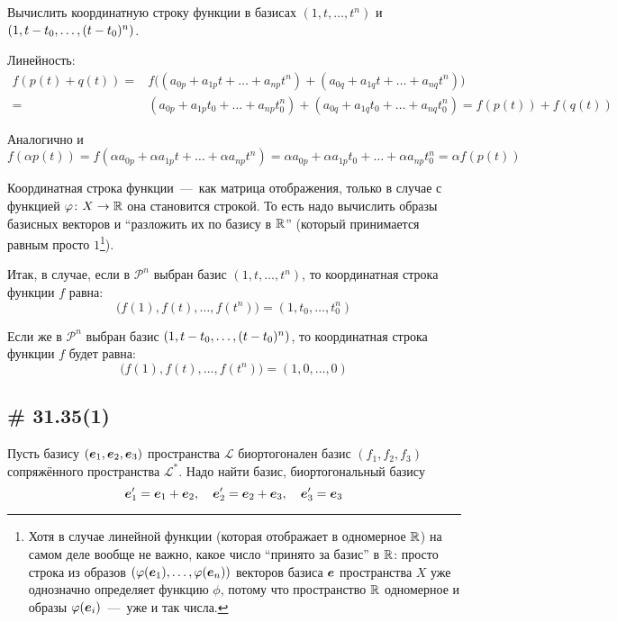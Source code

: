 \documentclass[a4paper,12pt]{article}
\begin{document}
  Вычислить координатную строку функции в базисах $(1, t, \ldots, t^n)$ и $(1, t \hm- t_0, \ldots, (t \hm- t_0)^n)$.
  
  \begin{solution}
    Линейность:
    \begin{equation*}
    \begin{split}
      f(p(t) + q(t)) = &f\bigl((a_{0p} + a_{1p} t + \ldots + a_{np} t^n) + (a_{0q} + a_{1q} t + \ldots + a_{nq} t^n)\bigr)\\
      = &(a_{0p} + a_{1p} t_0 + \ldots + a_{np} t_0^n) + (a_{0q} + a_{1q} t_0 + \ldots + a_{nq} t_0^n)
      = f(p(t)) + f(q(t))
    \end{split}
    \end{equation*}
    
    Аналогично и
    \[
      f(\alpha p(t)) = f(\alpha a_{0p} + \alpha a_{1p} t + \ldots + \alpha a_{np} t^n)
      = \alpha a_{0p} + \alpha a_{1p} t_0 + \ldots + \alpha a_{np} t_0^n
      = \alpha f(p(t))
    \]
    
    Координатная строка функции~---~как матрица отображения, только в случае с функцией $\phi\colon X \hm\to \RR$ она становится строкой.
    То есть надо вычислить образы базисных векторов и ``разложить их по базису в $\operatorname{\mathbb R}$'' (который принимается равным просто $1$\footnote{Хотя в случае линейной функции (которая отображает в одномерное $\operatorname{\mathbb R}$) на самом деле вообще не важно, какое число ``принято за базис'' в $\operatorname{\mathbb R}$: просто строка из образов $(\varphi(\boldsymbol e_1), \ldots, \varphi(\boldsymbol e_n))$ векторов базиса $\boldsymbol e$ пространства $X$ уже однозначно определяет функцию $\phi$, потому что пространство $\operatorname{\mathbb R}$ одномерное и образы $\varphi(\boldsymbol e_i)$~---~уже и так числа.}).
    
    Итак, в случае, если в $\mathcal P^{n}$ выбран базис $(1, t, \ldots, t^n)$, то координатная строка функции $f$ равна:
    \[
      \bigl(f(1), f(t), \ldots, f(t^n)\bigr) = (1, t_0, \ldots, t_0^n)
    \]
    
    Если же в $\mathcal P^{n}$ выбран базис $(1, t \hm- t_0, \ldots, (t \hm- t_0)^n)$, то координатная строка функции $f$ будет равна:
    \[
      \bigl(f(1), f(t), \ldots, f(t^n)\bigr) = (1, 0, \ldots, 0)
    \]
  \end{solution}
  
  
  \subsection{\# 31.35(1)}
  
  Пусть базису $(\boldsymbol e_1, \boldsymbol e_2, \boldsymbol e_3)$ пространства $\mathcal L$ биортогонален базис $(f_1, f_2, f_3)$ сопряжённого пространства $\mathcal L^*$.
  Надо найти базис, биортогональный базису
  \[
    \boldsymbol e_1' = \boldsymbol e_1 + \boldsymbol e_2,
    \quad \boldsymbol e_2' = \boldsymbol e_2 + \boldsymbol e_3,
    \quad \boldsymbol e_3' = \boldsymbol e_3
  \]
  
\end{document}
